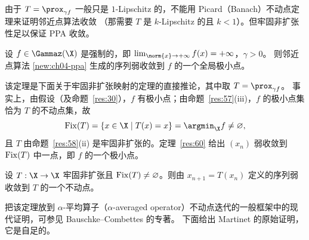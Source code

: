 由于 $T=\prox_{\gamma f}$ 一般只是 $1$-Lipschitz 的，不能用 Picard（Banach）不动点定理来证明邻近点算法收敛
（那需要 $T$ 是 $k$-Lipschitz 的且 $k<1$）。但牢固非扩张性足以保证 PPA 收敛。

\begin{theorem}[Martinet]
\label{res:59}
设 $f\in\Gammaz(\X)$ 是强制的，即 $\lim_{\norm{x}\to+\infty}f(x)=+\infty$，$\gamma>0$。
则邻近点算法 \eqref{new:ch04-ppa} 生成的序列弱收敛到 $f$ 的一个全局极小点。
\end{theorem}

该定理是下面关于牢固非扩张映射的定理的直接推论，其中取 $T=\prox_{\gamma f}$。
事实上，由假设（及命题~\ref{res:30}），$f$ 有极小点；由命题~\ref{res:57}(iii)，$f$ 的极小点集恰为 $T$ 的不动点集，故
\[
  \Fix(T)=\{x\in\X\mid T(x)=x\}=\argmin_\X f\neq\varnothing ,
\]
且 $T$ 由命题~\ref{res:58}(ii) 是牢固非扩张的。定理~\ref{res:60} 给出 $(x_n)$ 弱收敛到 $\operatorname{Fix}(T)$ 中一点，即 $f$ 的一个极小点。

\begin{theorem}[Martinet]
\label{res:60}
设 $T:\X\to\X$ 牢固非扩张且 $\operatorname{Fix}(T)\neq\varnothing$。则由 $x_{n+1}=T(x_n)$ 定义的序列弱收敛到 $T$ 的一个不动点。
\end{theorem}

把该定理放到 $\alpha$-平均算子（$\alpha$-averaged operator）不动点迭代的一般框架中的现代证明，可参见 Bauschke--Combettes 的专著。
下面给出 Martinet 的原始证明，它是自足的。

